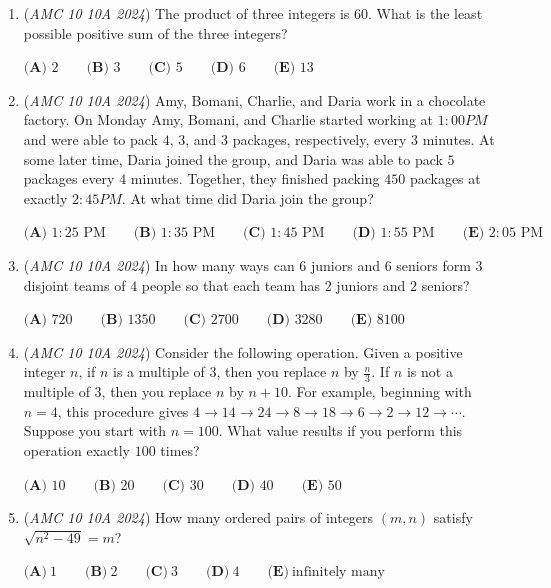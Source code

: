 \begin{enumerate}
 $\textbf{(A)}~6\qquad\textbf{(B)}~10\qquad\textbf{(C)}~12\qquad\textbf{(D)}~15\qquad\textbf{(E)}~24$


	\item (\textit{AMC 10 10A 2024}) The product of three integers is $60$. What is the least possible positive sum of the 
three integers? 


 $\textbf{(A) }2\qquad\textbf{(B) }3\qquad\textbf{(C) }5\qquad\textbf{(D) }6\qquad\textbf{(E) }13$


	\item (\textit{AMC 10 10A 2024}) Amy, Bomani, Charlie, and Daria work in a chocolate factory. On Monday Amy, Bomani, and Charlie started working at $1:00 PM$ and were able to pack $4$, $3$, and $3$ packages, respectively, every $3$ minutes. At some later time, Daria joined the group, and Daria was able to pack $5$ packages every $4$ minutes. Together, they finished packing $450$ packages at exactly $2:45 PM$. At what time did Daria join the group?


 $\textbf{(A) }1:25\text{ PM}\qquad\textbf{(B) }1:35\text{ PM}\qquad\textbf{(C) }1:45\text{ PM}\qquad\textbf{(D) }1:55\text{ PM}\qquad\textbf{(E) }2:05\text{ PM}$


	\item (\textit{AMC 10 10A 2024}) In how many ways can $6$ juniors and $6$ seniors form $3$ disjoint teams of $4$ people so 
that each team has $2$ juniors and $2$ seniors? 


 $\textbf{(A) }720\qquad\textbf{(B) }1350\qquad\textbf{(C) }2700\qquad\textbf{(D) }3280\qquad\textbf{(E) }8100$


	\item (\textit{AMC 10 10A 2024}) Consider the following operation. Given a positive integer $n$, if $n$ is a multiple of $3$, then you replace $n$ by $\frac{n}{3}$. If $n$ is not a multiple of $3$, then you replace $n$ by $n+10$. For example, beginning with $n=4$, this procedure gives $4\to14\to24\to8\to18\to6\to2\to12\to\cdots$. Suppose you start with $n=100$. What value results if you perform this operation exactly $100$ times?


 $\textbf{(A) }10\qquad\textbf{(B) }20\qquad\textbf{(C) }30\qquad\textbf{(D) }40\qquad\textbf{(E) }50$


	\item (\textit{AMC 10 10A 2024}) How many ordered pairs of integers $(m, n)$ satisfy $\sqrt{n^2 - 49} = m$?


 $\textbf{(A)}~1\qquad\textbf{(B)}~2\qquad\textbf{(C)}~3\qquad\textbf{(D)}~4\qquad\textbf{(E)}~\text{infinitely many}$



\end{enumerate}
